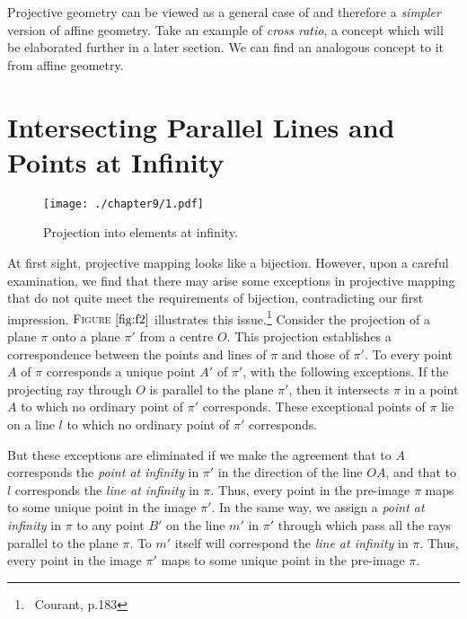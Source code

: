 Projective geometry can be viewed as a general case of and therefore a \emph{simpler} version of affine geometry. Take an example of \emph{cross ratio}, a concept which will be elaborated further in a later section. We can find an analogous concept to it from affine geometry. 

\begin{center}
\end{center}\smallskip


\section{Intersecting Parallel Lines and Points at Infinity}
\begin{figure}[htbp] %
\centering
\texttt{[image: ./chapter9/1.pdf]} 
\caption{Projection into elements at infinity.} 
\label{fig:f2}
\end{figure}

At first sight, projective mapping looks like a bijection. However, upon a careful examination, we find that there may arise some exceptions in projective mapping that do not quite meet the requirements of bijection, contradicting our first impression. \textsc{Figure $\ref{fig:f2}$} illustrates this issue.\footnote{\ Courant, p.183} Consider the projection of a plane $\pi$ onto a plane $\pi'$ from a centre $O$. This projection establishes a correspondence between the points and lines of $\pi$ and those of $\pi'$. To every point $A$ of $\pi$ corresponds a unique point $A'$ of $\pi'$, with the following exceptions. If the projecting ray through $O$ is parallel to the plane $\pi'$, then it intersects $\pi$ in a point $A$ to which no ordinary point of $\pi'$ corresponds. These exceptional points of $\pi$ lie on a line $l$ to which no ordinary point of $\pi'$ corresponds. 

But these exceptions are eliminated if we make the agreement that to $A$ corresponds the \emph{point at infinity} in $\pi'$ in the direction of the line $OA$, and that to $l$ corresponds the \emph{line at infinity} in $\pi$. Thus, every point in the pre-image $\pi$ maps to some unique point in the image $\pi'$. In the same way, we assign a \emph{point at infinity} in $\pi$ to any point $B'$ on the line $m'$ in $\pi'$ through which pass all the rays parallel to the plane $\pi$. To $m'$ itself will correspond the \emph{line at infinity} in $\pi$. Thus, every point in the image $\pi'$ maps to some unique point in the pre-image $\pi$.

